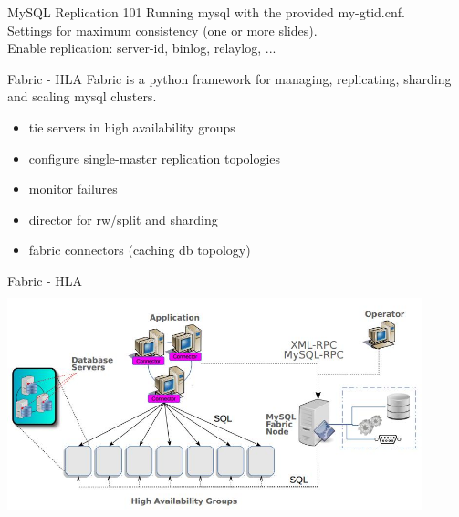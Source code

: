 \documentclass{beamer}[10]
\begin{document}
\begin{pyframe}{MySQL Replication 101}
Running mysql with the provided my-gtid.cnf.
\\
Settings for maximum consistency (one or more slides).
\\
Enable replication: server-id, binlog, relaylog, ...

\end{pyframe}

%
%
\begin{pyframe}{Fabric - HLA}
Fabric is a python framework for managing, replicating, sharding and scaling mysql clusters.
\begin{itemize}
\item tie servers in high availability groups
\item configure single-master replication topologies
\item monitor failures
\item director for rw/split and sharding
\item fabric connectors (caching db topology)
\end{itemize}
\end{pyframe}


\begin{pyframe}{Fabric - HLA}
\includegraphics[height=6.6cm,width=12cm]{images/mysql-fabric-hla.jpg}
\end{pyframe}
\end{document}
